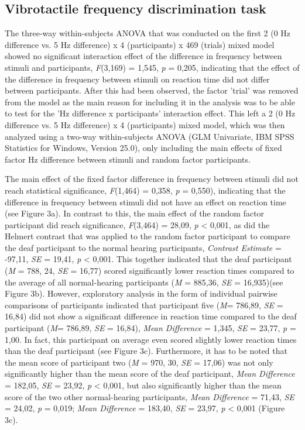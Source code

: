 \documentclass[12pt]{article}
\begin{document}
\subsection{Vibrotactile frequency discrimination task}
The three-way within-subjects ANOVA that was conducted on the first 2 (0 Hz difference vs. 5 Hz difference) x 4 (participants) x 469 (trials) mixed model showed no significant interaction effect of the difference in frequency between stimuli and participants, \textit{F}(3,169) = 1,545, \textit{p} = 0,205, indicating that the effect of the difference in frequency between stimuli on reaction time did not differ between participants. After this had been observed, the factor 'trial' was removed from the model as the main reason for including it in the analysis was to be able to test for the 'Hz difference x participants' interaction effect. This left a 2 (0 Hz difference vs. 5 Hz difference) x 4 (participants) mixed model, which was then analyzed using a two-way within-subjects ANOVA (GLM Univariate, IBM SPSS Statistics for Windows, Version 25.0), only including the main effects of fixed factor Hz difference between stimuli and random factor participants. 
%
\par The main effect of the fixed factor difference in frequency between stimuli did not reach statistical significance, \textit{F}(1,464) = 0,358, \textit{p} = 0,550), indicating that the difference in frequency between stimuli did not have an effect on reaction time (see Figure 3a). In contrast to this, the main effect of the random factor participant did reach significance, \textit{F}(3,464) = 28,09, \textit{p} < 0,001, as did the Helmert contrast that was applied to the random factor participant to compare the deaf participant to the normal hearing participants, \textit{Contrast Estimate} = -97,11, \textit{SE} = 19,41, \textit{p} < 0,001. This together indicated that the deaf participant (\textit{M} = 788, 24, \textit{SE} = 16,77) scored significantly lower reaction times compared to the average of all normal-hearing participants (\textit{M} = 885,36, \textit{SE} = 16,935)(see Figure 3b). However, exploratory analysis in the form of individual pairwise comparisons of participants indicated that participant five (\textit{M}= 786,89, \textit{SE} = 16,84) did not show a significant difference in reaction time compared to the deaf participant (\textit{M}= 786,89, \textit{SE} = 16,84), \textit{Mean Difference} = 1,345, \textit{SE} = 23,77, \textit{p} = 1,00. In fact, this participant on average even scored slightly lower reaction times than the deaf participant (see Figure 3c). Furthermore, it has to be noted that the mean score of participant two (\textit{M} = 970, 30, \textit{SE} = 17,06) was not only significantly higher than the mean score of the deaf participant, \textit{Mean Difference} = 182,05, \textit{SE} = 23,92, \textit{p} < 0,001, but also significantly higher than the mean score of the two other normal-hearing participants, \textit{Mean Difference} = 71,43, \textit{SE} = 24,02, \textit{p} = 0,019; \textit{Mean Difference} = 183,40, \textit{SE} = 23,97, \textit{p} < 0,001 (Figure 3c).
\end{document}
